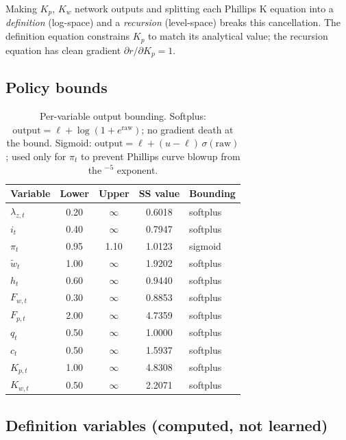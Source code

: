 \documentclass[11pt]{article}
\begin{document}
Making $K_p$, $K_w$ network outputs and splitting each Phillips K equation
into a \emph{definition} (log-space) and a \emph{recursion} (level-space)
breaks this cancellation. The definition equation constrains $K_p$ to match
its analytical value; the recursion equation has clean gradient $\partial r/\partial K_p = 1$.

\subsection{Policy bounds}

\begin{table}[h]
\centering
\begin{tabular}{lcccl}
\toprule
Variable & Lower & Upper & SS value & Bounding \\
\midrule
$\lambda_{z,t}$ & 0.20 & $\infty$ & 0.6018 & softplus \\
$i_t$            & 0.40 & $\infty$ & 0.7947 & softplus \\
$\pi_t$          & 0.95 & 1.10     & 1.0123 & sigmoid \\
$\tilde{w}_t$    & 1.00 & $\infty$ & 1.9202 & softplus \\
$h_t$            & 0.60 & $\infty$ & 0.9440 & softplus \\
$F_{w,t}$        & 0.30 & $\infty$ & 0.8853 & softplus \\
$F_{p,t}$        & 2.00 & $\infty$ & 4.7359 & softplus \\
$q_t$            & 0.50 & $\infty$ & 1.0000 & softplus \\
$c_t$            & 0.50 & $\infty$ & 1.5937 & softplus \\
$K_{p,t}$        & 1.00 & $\infty$ & 4.8308 & softplus \\
$K_{w,t}$        & 0.50 & $\infty$ & 2.2071 & softplus \\
\bottomrule
\end{tabular}
\caption{Per-variable output bounding. Softplus:
$\text{output} = \ell + \log(1+e^{\text{raw}})$; no gradient death at the bound.
Sigmoid: $\text{output} = \ell + (u-\ell)\,\sigma(\text{raw})$; used only for
$\pi_t$ to prevent Phillips curve blowup from the ${}^{-5}$ exponent.}
\end{table}

\subsection{Definition variables (computed, not learned)}
\end{document}
